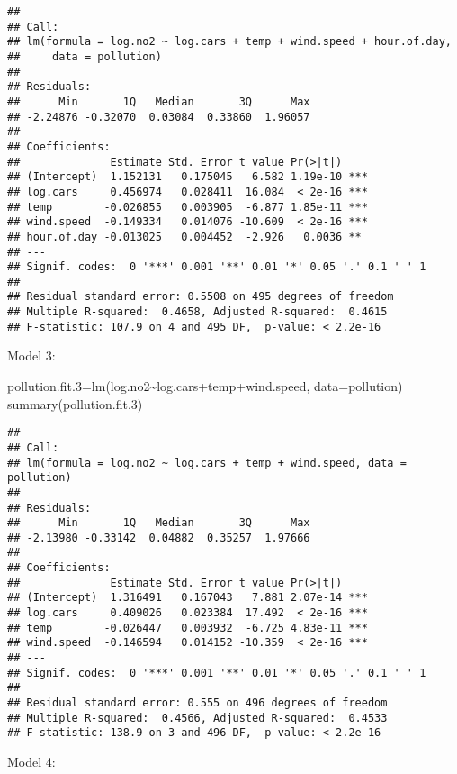 \documentclass[
]{article}
\newenvironment{Shaded}{\begin{snugshade}}{\end{snugshade}}
\newcommand{\AttributeTok}[1]{\textcolor[rgb]{0.77,0.63,0.00}{#1}}
\newcommand{\FloatTok}[1]{\textcolor[rgb]{0.00,0.00,0.81}{#1}}
\newcommand{\FunctionTok}[1]{\textcolor[rgb]{0.00,0.00,0.00}{#1}}
\newcommand{\NormalTok}[1]{#1}
\newcommand{\OtherTok}[1]{\textcolor[rgb]{0.56,0.35,0.01}{#1}}
\newcommand{\SpecialCharTok}[1]{\textcolor[rgb]{0.00,0.00,0.00}{#1}}
\begin{document}
\begin{verbatim}
## 
## Call:
## lm(formula = log.no2 ~ log.cars + temp + wind.speed + hour.of.day, 
##     data = pollution)
## 
## Residuals:
##      Min       1Q   Median       3Q      Max 
## -2.24876 -0.32070  0.03084  0.33860  1.96057 
## 
## Coefficients:
##              Estimate Std. Error t value Pr(>|t|)    
## (Intercept)  1.152131   0.175045   6.582 1.19e-10 ***
## log.cars     0.456974   0.028411  16.084  < 2e-16 ***
## temp        -0.026855   0.003905  -6.877 1.85e-11 ***
## wind.speed  -0.149334   0.014076 -10.609  < 2e-16 ***
## hour.of.day -0.013025   0.004452  -2.926   0.0036 ** 
## ---
## Signif. codes:  0 '***' 0.001 '**' 0.01 '*' 0.05 '.' 0.1 ' ' 1
## 
## Residual standard error: 0.5508 on 495 degrees of freedom
## Multiple R-squared:  0.4658, Adjusted R-squared:  0.4615 
## F-statistic: 107.9 on 4 and 495 DF,  p-value: < 2.2e-16
\end{verbatim}

Model 3:

\begin{Shaded}
\begin{Highlighting}[]
\NormalTok{pollution.fit}\FloatTok{.3}\OtherTok{=}\FunctionTok{lm}\NormalTok{(log.no2}\SpecialCharTok{\textasciitilde{}}\NormalTok{log.cars}\SpecialCharTok{+}\NormalTok{temp}\SpecialCharTok{+}\NormalTok{wind.speed, }\AttributeTok{data=}\NormalTok{pollution)}
\FunctionTok{summary}\NormalTok{(pollution.fit}\FloatTok{.3}\NormalTok{)}
\end{Highlighting}
\end{Shaded}

\begin{verbatim}
## 
## Call:
## lm(formula = log.no2 ~ log.cars + temp + wind.speed, data = pollution)
## 
## Residuals:
##      Min       1Q   Median       3Q      Max 
## -2.13980 -0.33142  0.04882  0.35257  1.97666 
## 
## Coefficients:
##              Estimate Std. Error t value Pr(>|t|)    
## (Intercept)  1.316491   0.167043   7.881 2.07e-14 ***
## log.cars     0.409026   0.023384  17.492  < 2e-16 ***
## temp        -0.026447   0.003932  -6.725 4.83e-11 ***
## wind.speed  -0.146594   0.014152 -10.359  < 2e-16 ***
## ---
## Signif. codes:  0 '***' 0.001 '**' 0.01 '*' 0.05 '.' 0.1 ' ' 1
## 
## Residual standard error: 0.555 on 496 degrees of freedom
## Multiple R-squared:  0.4566, Adjusted R-squared:  0.4533 
## F-statistic: 138.9 on 3 and 496 DF,  p-value: < 2.2e-16
\end{verbatim}

Model 4:
\end{document}
